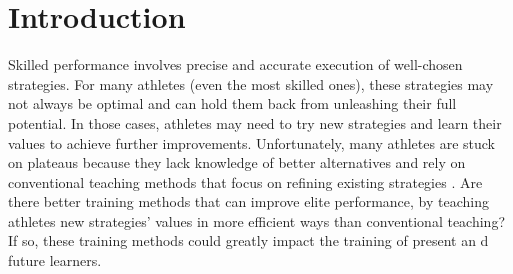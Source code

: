 \documentclass[pdflatex,sn-nature]{sn-jnl}%
\theoremstyle{thmstyleone}%
\theoremstyle{thmstyletwo}%
\theoremstyle{thmstylethree}%
\begin{document}
\section{Introduction}
Skilled performance involves precise and accurate execution of well-chosen strategies\cite{krakauer_motor_2019,wolpert_motor_2010, wolpert_principles_2011, diedrichsen_motor_2015, chen_effects_2018, stanley_motor_2013, du_relationship_2022, mangalam_investigating_2023, taylor_role_2012, tsay_strategy_2023}. For many athletes (even the most skilled ones), these strategies may not always be optimal and can hold them back from unleashing their full potential. In those cases, athletes may need to try new strategies and learn their values to achieve further improvements. Unfortunately, many athletes are stuck on plateaus because they lack knowledge of better alternatives and rely on conventional teaching methods that focus on refining existing strategies  \cite{thorndike_educational_1913, grayloooooong,grayshort,ericsson_scientific_1998, ericsson_development_2003}. Are there better training methods that can improve elite performance, by teaching athletes new strategies' values in more efficient ways than conventional teaching? If so, these training methods could greatly impact the training of present an d future learners.

\end{document}
